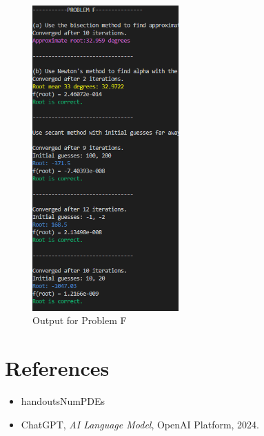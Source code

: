 \documentclass[a4paper]{article}
\begin{document}
\begin{figure}[H]  %
  \centering
  \includegraphics[width=0.5\textwidth]{./picture/ProblemF.png}
  \caption{Output for Problem F}
\end{figure}


\section{References}
\begin{itemize}
   \item handoutsNumPDEs
   \item ChatGPT, \textit{AI Language Model}, OpenAI Platform, 2024.
\end{itemize}
\end{document}
